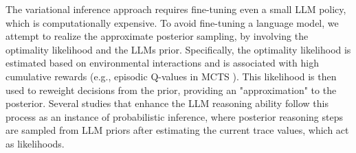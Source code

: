 \documentclass{article} %
\theoremstyle{plain}
\theoremstyle{definition}
\theoremstyle{remark}
\begin{document}
The variational inference approach requires fine-tuning even a small LLM policy, which is computationally expensive. To avoid fine-tuning a language model, we attempt to realize the approximate posterior sampling, by involving the optimality likelihood and the LLMs prior. Specifically, the optimality likelihood is estimated based on environmental interactions and is associated with high cumulative rewards (e.g., episodic Q-values in MCTS \citep{hao2023reasoning}). This likelihood is then used to reweight decisions from the prior, providing an "approximation" to the posterior. Several studies \citep{yao2024tree, feng2023alphazero} that enhance the LLM reasoning ability follow this process as an instance of probabilistic inference, where posterior reasoning steps are sampled from LLM priors after estimating the current trace values, which act as likelihoods.  
\end{document}
